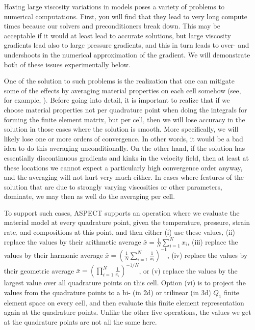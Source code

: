 \documentclass{article}
\newcommand{\aspect}{\textsc{ASPECT}}
\begin{document}
Having large viscosity variations in models poses a variety of problems to
numerical computations. First, you will find that they lead to very long compute
times because our solvers and preconditioners break down. This may be
acceptable if it would at least lead to accurate solutions, but large viscosity
gradients lead also to large pressure gradients, and this in turn leads to over-
and undershoots in the numerical approximation of the gradient. We will
demonstrate both of these issues experimentally below.

One of the solution to such problems is the realization that one can mitigate
some of the effects by averaging material properties on each cell somehow
(see, for example, \cite{Bab08,Deu08,DMGT11,Thi15,TMK14}).
Before going into detail, it is important to realize that if we choose material
properties not per quadrature point when doing the integrals for forming the
finite element matrix, but per cell, then we will lose accuracy in the solution
in those cases where the solution is smooth. More specifically, we will likely
lose one or more orders of convergence. In other words, it would be a bad idea
to do this averaging unconditionally. On the other hand, if the solution has
essentially discontinuous gradients and kinks in the velocity field, then at
least at these locations we cannot expect a particularly high convergence order
anyway, and the averaging will not hurt very much either. In cases where
features of the solution that are due to strongly varying viscosities or other
parameters, dominate, we may then as well do the averaging per cell.

To support such cases, \aspect{} supports an operation where we evaluate the
material model at every quadrature point, given the temperature, pressure,
strain rate, and compositions at this point, and then either (i) use these
values, (ii) replace the values by their arithmetic average $\bar x = \frac 1N
\sum_{i=1}^N x_i$, (iii) replace the values by their harmonic average $\bar x
= \left(\frac 1N \sum_{i=1}^N \frac{1}{x_i}\right)^{-1}$, (iv) replace the
values by their geometric average $\bar x
= \left(\prod_{i=1}^N \frac{1}{x_i}\right)^{-1/N}$,
or (v) replace the
values by the largest value over all quadrature points on this cell. Option
(vi) is to project the values from the quadrature points to a bi- (in 2d) or
trilinear (in 3d) $Q_1$ finite element space on every cell, and then evaluate this
finite element representation again at the quadrature points. Unlike the other
five operations, the values we get at the quadrature points are not all the
same here.
\end{document}
